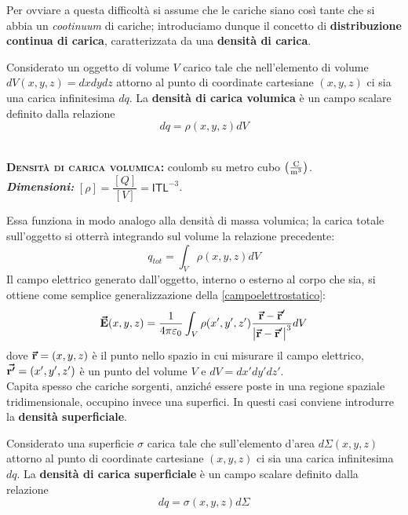 Per ovviare a questa difficoltà si assume che le cariche siano così tante che si abbia un \textit{cootinuum} di cariche; introduciamo dunque il concetto di \textbf{distribuzione continua di carica}, caratterizzata da una \textbf{densità di carica}.
\begin{define}
	Considerato un oggetto di volume $V$ carico tale che nell'elemento di volume $dV(x,y,z)=dxdydz$ attorno al punto di coordinate cartesiane $(x,y,z)$ ci sia una carica infinitesima $dq$. La \textbf{densità di carica volumica} è un campo scalare definito dalla relazione
	\begin{equation}
		dq=\rho(x,y,z)dV
	\end{equation}
\end{define}
\begin{units}~\\
	\textbf{\textsc{Densità di carica volumica:}} coulomb su metro cubo $\left(\unit[per-mode = fraction]{\coulomb\per\cubic\meter}\right)$.\\
	\textit{\textbf{Dimensioni:}} $[\rho]=\dfrac{[Q]}{[V]}=\mathsf{I}\mathsf{T}\mathsf{L}^{-3}$.
\end{units}
Essa funziona in modo analogo alla densità di massa volumica; la carica totale sull'oggetto si otterrà integrando sul volume la relazione precedente:
\begin{equation}
	q_{tot}=\int_V\rho(x,y,z)dV
\end{equation}
Il campo elettrico generato dall'oggetto, interno o esterno al corpo che sia, si ottiene come semplice generalizzazione della \ref{campoelettrostatico}:
\begin{equation}
	\vb*{\va{E}}(x,y,z)=\frac{1}{4\pi\varepsilon_0}\int_V\rho(x',y',z')\frac{\vb*{\va{r}}-\vb*{\va{r}}'}{\abs{\vb*{\va{r}}-\vb*{\va{r}}'}^3}dV
\end{equation}
dove $\vb*{\va{r}}=(x,y,z)$ è il punto nello spazio in cui misurare il campo elettrico, $\vb*{\va{r'}}=(x',y',z')$ è un punto del volume $V$ e $dV=dx'dy'dz'$.\\
Capita spesso che cariche sorgenti, anziché essere poste in una regione spaziale tridimensionale, occupino invece una superfici. In questi casi conviene introdurre la \textbf{densità superficiale}.
 \begin{define}
 	Considerato una superficie $\sigma$ carica tale che sull'elemento d'area $d\Sigma(x,y,z)$ attorno al punto di coordinate cartesiane $(x,y,z)$ ci sia una carica infinitesima $dq$. La \textbf{densità di carica superficiale} è un campo scalare definito dalla relazione
 	\begin{equation}
 		dq=\sigma(x,y,z)d\Sigma
 	\end{equation}
 \end{define}


